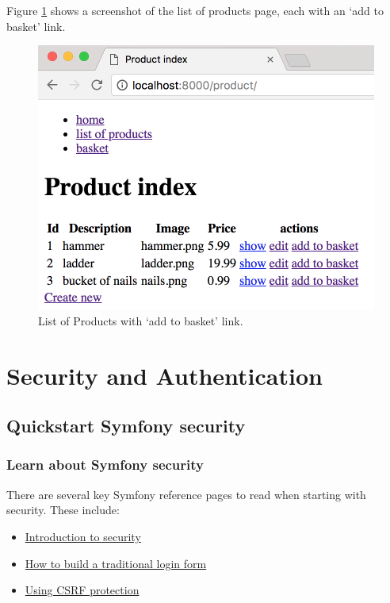 \documentclass[a4paperpaper,openright]{book}
\begin{document}
Figure \ref{add_to_basket} shows a screenshot of the list of products
page, each with an `add to basket' link.

\begin{figure}
\centering
\includegraphics{./tex2pdf.-65f13e14688ab55b/ca3e9c1fec1e44180d0d9921c1436d7d8338d566.png}
\caption{List of Products with `add to basket' link.
\label{add_to_basket}}
\end{figure}

\part{Security and Authentication}

\hypertarget{quickstart-symfony-security}{%
\chapter{Quickstart Symfony
security}\label{quickstart-symfony-security}}

\hypertarget{learn-about-symfony-security}{%
\section{Learn about Symfony
security}\label{learn-about-symfony-security}}

There are several key Symfony reference pages to read when starting with
security. These include:

\begin{itemize}
\item
  \href{https://symfony.com/doc/current/security.html}{Introduction to
  security}
\item
  \href{https://symfony.com/doc/current/security/form_login_setup.html}{How
  to build a traditional login form}
\item
  \href{https://symfony.com/doc/current/security/csrf.html}{Using CSRF
  protection}
\end{itemize}
\end{document}
